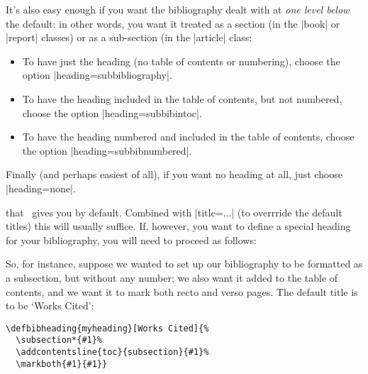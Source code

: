 It's also easy enough if you want the bibliography dealt with at
\emph{one level below} the default: in other words, you want it
treated as a section (in the |book| or |report| classes) or
as a sub-section (in the |article| class:
\begin{itemize}
\item To have just the heading (no table of contents or numbering),
  choose the option |heading=subbibliography|.
\item To have the heading included in the table of contents, but not
  numbered, choose the option |heading=subbibintoc|.
\item To have the heading numbered and included in the table of
  contents, choose the option |heading=subbibnumbered|.
\end{itemize}

Finally (and perhaps easiest of all), if you want no heading at all,
just choose |heading=none|.

 that \biblatex\ gives you by
default. Combined with |title=...| (to overrride the default titles)
this will usually suffice. If, however, you want to define a special
heading for your bibliography, you will need to proceed as
follows:

So, for instance, suppose we wanted to set up our bibliography to be
formatted as a subsection, but without any number; we also want it
added to the table of contents, and we want it to mark both recto and
verso pages. The default title is to be `Works Cited':
\begin{verbatim}
\defbibheading{myheading}[Works Cited]{%
  \subsection*{#1}%
  \addcontentsline{toc}{subsection}{#1}%
  \markboth{#1}{#1}}
\end{verbatim}

